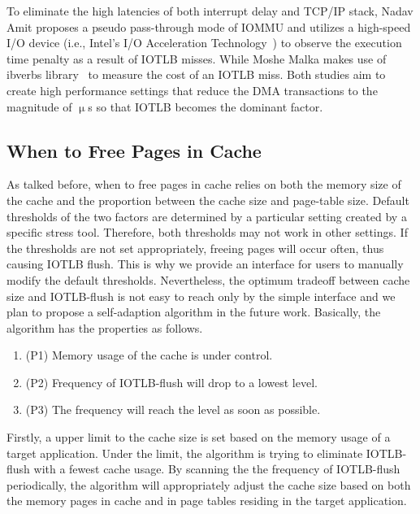 To eliminate the high latencies of both interrupt delay and TCP/IP stack, Nadav Amit proposes a pseudo pass-through mode of IOMMU and utilizes a high-speed I/O device (i.e., Intel’s I/O Acceleration Technology~\cite{lauritzenintel}) to observe the execution time penalty as a result of IOTLB misses. While Moshe Malka makes use of ibverbs library~\cite{ibverbs evaluation,kerr2011dissecting} to measure the cost of an IOTLB miss.
Both studies aim to create high performance settings that reduce the DMA transactions to the magnitude of $\upmu$s so that IOTLB becomes the dominant factor.

\subsection{When to Free Pages in Cache}

As talked before, when to free pages in cache relies on both the memory size of the cache and the proportion between the cache size and page-table size. Default thresholds of the two factors are determined by a particular setting created by a specific stress tool. Therefore, both thresholds may not work in other settings. If the thresholds are not set appropriately, freeing pages will occur often, thus causing IOTLB flush. This is why we provide an interface for users to manually modify the default thresholds. Nevertheless, the optimum tradeoff between cache size and IOTLB-flush is not easy to reach only by the simple interface and we plan to propose a self-adaption algorithm in the future work. Basically, the algorithm has the properties as follows.
\begin{enumerate}
\item (P1) Memory usage of the cache is under control.
\item (P2) Frequency of IOTLB-flush will drop to a lowest level.
\item (P3) The frequency will reach the level as soon as possible.
\end{enumerate}

Firstly, a upper limit to the cache size is set based on the memory usage of a target application. Under the limit, the algorithm is trying to eliminate IOTLB-flush with a fewest cache usage. By scanning the the frequency of IOTLB-flush periodically, the algorithm will appropriately adjust the cache size based on both the memory pages in cache and in page tables residing in the target application.




